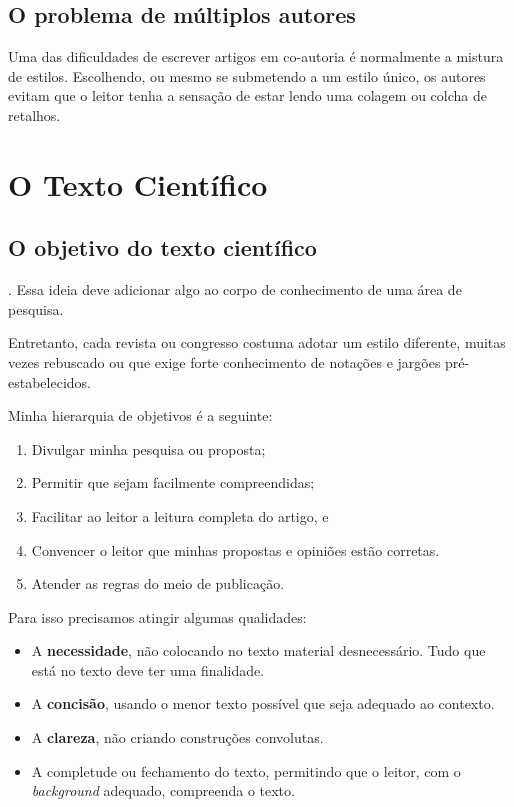 \documentclass[openany]{book}
\begin{document}
\section{O problema de múltiplos autores}

 Uma das dificuldades de escrever artigos em co-autoria é normalmente a mistura de estilos. Escolhendo, ou mesmo se submetendo a um estilo único, os autores evitam que o leitor tenha a sensação de estar lendo uma colagem ou colcha de retalhos.

\chapter{O Texto Científico}

\section{O objetivo do texto científico}

. Essa ideia deve adicionar algo ao corpo de conhecimento de uma área de pesquisa.

 Entretanto, cada revista ou congresso costuma adotar um estilo diferente, muitas vezes  rebuscado ou que exige forte conhecimento de notações e jargões pré-estabelecidos.

Minha hierarquia de objetivos é a seguinte:
\begin{enumerate}
    \item Divulgar minha pesquisa ou proposta;
    \item Permitir que sejam facilmente compreendidas;
    \item Facilitar ao leitor a leitura completa do artigo, e
    \item Convencer o leitor que minhas propostas e opiniões estão corretas.
    \item Atender as regras do meio de publicação.
\end{enumerate}

Para isso precisamos atingir algumas qualidades:
\begin{itemize}
    \item A \textbf{necessidade}, não colocando no texto material desnecessário. Tudo que está no texto deve ter uma finalidade.
    \item A \textbf{concisão}, usando o menor texto possível que seja adequado ao contexto.
    \item A \textbf{clareza}, não criando construções convolutas.
    \item A completude ou fechamento do texto, permitindo que o leitor, com o \textit{background} adequado, compreenda o texto.
\end{itemize}
\end{document}
